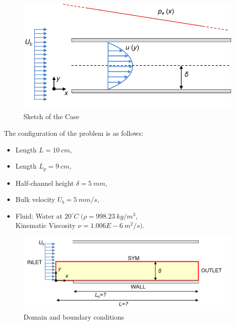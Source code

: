 \documentclass[12pt]{article}
\begin{document}
        \begin{figure}[!ht]
                \includegraphics[width=\textwidth]{Case_Sketch.png}
                \centering
                \caption{Sketch of the Case}
                \label{fig:sketch}
        \end{figure}

        The configuration of the problem is as follows:
        \begin{itemize}
                \item Length \( L = 10 \: cm \),
                \item Length \( L_p = 9 \: cm \),
                \item Half-channel height \(\delta = 5 \: mm\),
                \item Bulk velocity \( U_b = 5 \: mm/s \),
                \item Fluid: Water at \( 20^{\circ}C \; ( \rho = 998.23 \: kg/m^3\), \\ Kinematic Viscosity \( \nu = 1.006E-6 \: m^2/s ) \).
        \end{itemize}

        \begin{figure}[!ht]
                \includegraphics[width=\textwidth]{Conditions.png}
                \centering
                \caption{Domain and boundary conditions}
                \label{fig:conditions}
        \end{figure}
\end{document}
